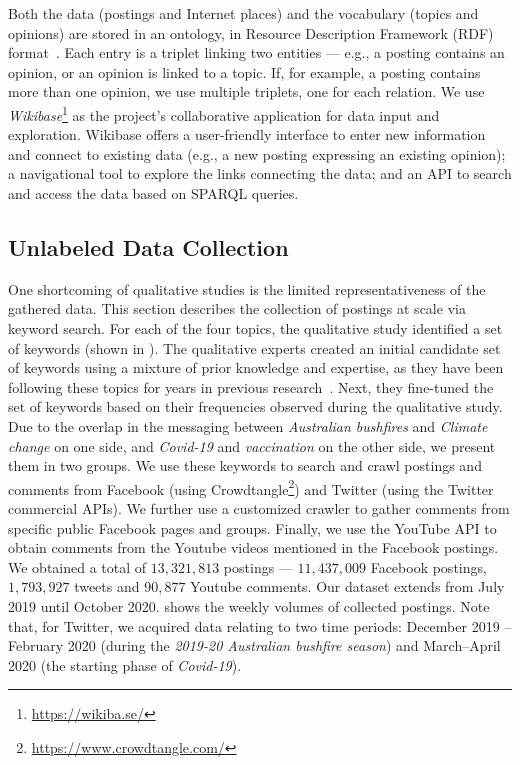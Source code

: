 Both the data (postings and Internet places) and the vocabulary (topics and opinions) are stored in an ontology, in Resource Description Framework (RDF) format~\citep{brickley1999resource}.
Each entry is a triplet linking two entities --- e.g., a posting contains an opinion, or an opinion is linked to a topic.
If, for example, a posting contains more than one opinion, we use multiple triplets, one for each relation.
We use \textit{Wikibase}\footnote{\url{https://wikiba.se/}} as the project's collaborative application for data input and exploration.
Wikibase offers a user-friendly interface to enter new information and connect to existing data (e.g., a new posting expressing an existing opinion);
a navigational tool to explore the links connecting the data; and
an API to search and access the data based on SPARQL queries.







\subsection{Unlabeled Data Collection}
\label{subsec:unlabeled-data-collection}



One shortcoming of qualitative studies is the limited representativeness of the gathered data.
This section describes the collection of postings at scale via keyword search.
For each of the four topics, the qualitative study identified a set of keywords (shown in ).
The qualitative experts created an initial candidate set of keywords using a mixture of prior knowledge and expertise, as they have been following these topics for years in previous research~\citep{JohnsFlagging2017}.
Next, they fine-tuned the set of keywords based on their frequencies observed during the qualitative study.
Due to the overlap in the messaging between \textit{Australian bushfires} and \emph{Climate change} on one side, and \emph{Covid-19} and \emph{vaccination} on the other side, we present them in two groups.
We use these keywords to search and crawl postings and comments from Facebook (using Crowdtangle\footnote{\url{https://www.crowdtangle.com/}}) and Twitter (using the Twitter commercial APIs).
We further use a customized crawler to gather comments from specific public Facebook pages and groups.
Finally, we use the YouTube API to obtain comments from the Youtube videos mentioned in the Facebook postings.
We obtained a total of $13,321,813$ postings --- $11,437,009$ Facebook postings, $1,793,927$ tweets and $90,877$ Youtube comments.
Our dataset extends from July 2019 until October 2020.  shows the weekly volumes of collected postings.
Note that, for Twitter, we acquired data relating to two time periods: December 2019 -- February 2020 (during the \textit{2019-20 Australian bushfire season}) and March--April 2020 (the starting phase of \textit{Covid-19}).

